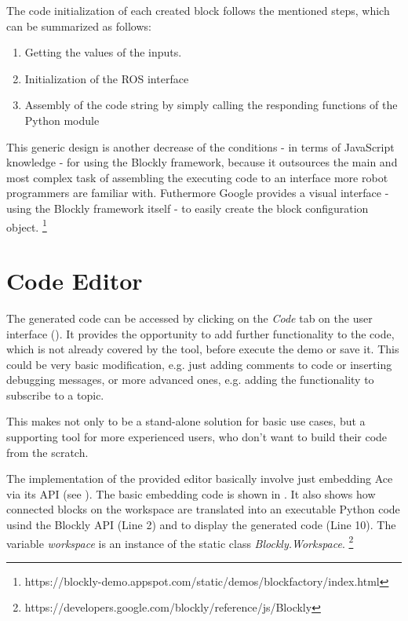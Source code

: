 The code initialization of each created block follows the mentioned steps, which can be summarized as follows:
\begin{enumerate}
	\item Getting the values of the inputs.
	\item Initialization of the ROS interface
	\item Assembly of the code string by simply calling the responding functions of the Python module
\end{enumerate}

This generic design is another decrease of the conditions - in terms of JavaScript knowledge - for using the Blockly framework, because it outsources the main and most complex task of assembling the executing code to an interface more robot programmers are familiar with. Futhermore Google provides a visual interface - using the Blockly framework itself - to easily create the block configuration object. \footnote{https://blockly-demo.appspot.com/static/demos/blockfactory/index.html}

\section{Code Editor} \label{sec:CodeEditor}
The generated code can be accessed by clicking on the \textit{Code} tab on the user interface (). It provides the opportunity to add further functionality to the code, which is not already covered by the tool, before execute the demo or save it. This could be very basic modification, e.g. just adding comments to code or inserting debugging messages, or more advanced ones, e.g. adding the functionality to subscribe to a topic.

This makes \toolname{} not only to be a stand-alone solution for basic use cases, but a supporting tool for more experienced users, who don't want to build their code from the scratch.

\begin{figure}[htbp]
	
\end{figure}

The implementation of the provided editor basically involve just embedding Ace via its API (see ). The basic embedding code is shown in . It also shows how connected blocks on the workspace are translated into an executable Python code usind the Blockly API (Line 2) and to display the generated code (Line 10). The variable \textit{workspace} is an instance of the static class \textit{Blockly.Workspace}. \footnote{https://developers.google.com/blockly/reference/js/Blockly}

